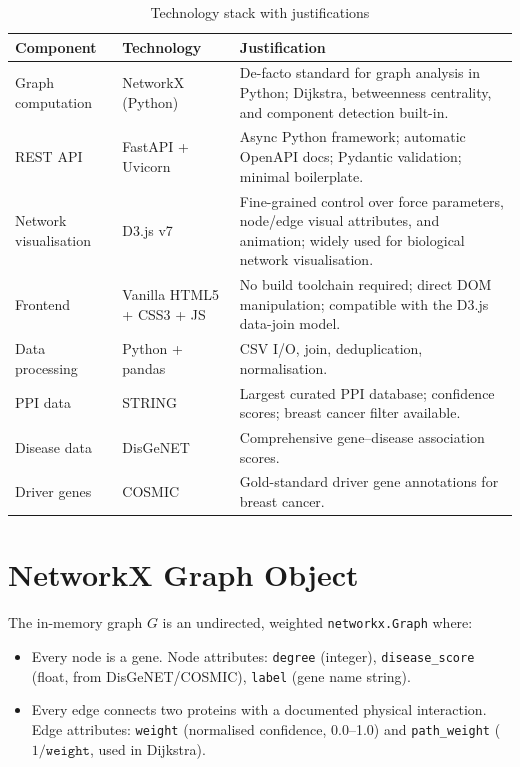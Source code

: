 \documentclass[12pt,a4paper]{report}
\begin{document}
\begin{table}[H]
  \centering
  \caption{Technology stack with justifications}
  \label{tab:techstack}
  \begin{tabularx}{\textwidth}{llX}
    \toprule
    \textbf{Component} & \textbf{Technology} & \textbf{Justification} \\
    \midrule
    Graph computation & NetworkX (Python) & De-facto standard for graph analysis in Python; Dijkstra, betweenness centrality, and component detection built-in. \\
    REST API & FastAPI + Uvicorn & Async Python framework; automatic OpenAPI docs; Pydantic validation; minimal boilerplate. \\
    Network visualisation & D3.js v7 & Fine-grained control over force parameters, node/edge visual attributes, and animation; widely used for biological network visualisation. \\
    Frontend & Vanilla HTML5 + CSS3 + JS & No build toolchain required; direct DOM manipulation; compatible with the D3.js data-join model. \\
    Data processing & Python + pandas & CSV I/O, join, deduplication, normalisation. \\
    PPI data & STRING \citep{szklarczyk2023string} & Largest curated PPI database; confidence scores; breast cancer filter available. \\
    Disease data & DisGeNET \citep{pinero2020disgenet} & Comprehensive gene--disease association scores. \\
    Driver genes & COSMIC & Gold-standard driver gene annotations for breast cancer. \\
    \bottomrule
  \end{tabularx}
\end{table}

\section{NetworkX Graph Object}

The in-memory graph $G$ is an undirected, weighted \texttt{networkx.Graph} where:
\begin{itemize}
  \item Every node is a gene. Node attributes: \texttt{degree} (integer), \texttt{disease\_score} (float, from DisGeNET/COSMIC), \texttt{label} (gene name string).
  \item Every edge connects two proteins with a documented physical interaction. Edge attributes: \texttt{weight} (normalised confidence, 0.0--1.0) and \texttt{path\_weight} ($1/\texttt{weight}$, used in Dijkstra).
\end{itemize}
\end{document}
